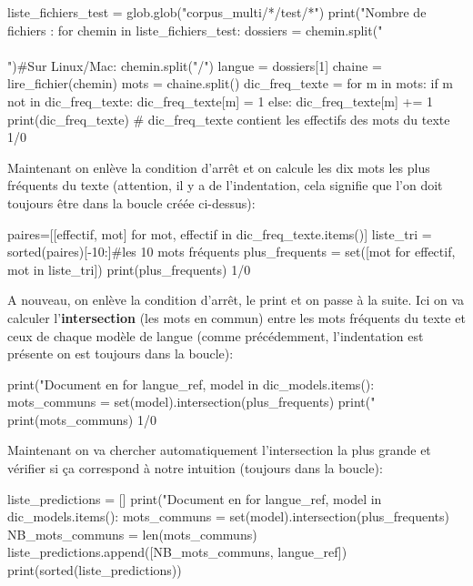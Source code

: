 \begin{python}
liste_fichiers_test = glob.glob("corpus_multi/*/test/*")
print("Nombre de fichiers : %
for chemin in liste_fichiers_test:
  dossiers = chemin.split("\\\\")#Sur Linux/Mac: chemin.split("/")
  langue = dossiers[1]
  chaine = lire_fichier(chemin)
  mots = chaine.split()
  dic_freq_texte = {}
  for m in mots:
    if m not in dic_freq_texte:
      dic_freq_texte[m] = 1
    else:
      dic_freq_texte[m] += 1
  print(dic_freq_texte)
  # dic_freq_texte contient les effectifs des mots du texte
  1/0
\end{python}

Maintenant on enlève la condition d'arrêt et on calcule les dix mots les plus fréquents du texte (attention, il y a de l'indentation, cela signifie que l'on doit toujours être dans la boucle créée ci-dessus):

\begin{python}
  paires=[[effectif, mot] for mot, effectif in  dic_freq_texte.items()]
  liste_tri = sorted(paires)[-10:]#les 10 mots fréquents
  plus_frequents = set([mot for effectif, mot in liste_tri])
  print(plus_frequents)
  1/0
\end{python}

A nouveau, on enlève la condition d'arrêt, le print et on passe à la suite. Ici on va calculer l'\textbf{intersection} (les mots en commun) entre les mots fréquents du texte et ceux de chaque modèle de langue (comme précédemment, l'indentation est présente on est toujours dans la boucle):

\begin{python}
  print("Document en %
  for langue_ref, model in dic_models.items():
    mots_communs = set(model).intersection(plus_frequents)
    print("%
    print(mots_communs)
  1/0
\end{python}

Maintenant on va chercher automatiquement l'intersection la plus grande et vérifier si ça correspond à notre intuition (toujours dans la boucle):

\begin{python}
  liste_predictions = []
  print("Document en %
  for langue_ref, model in dic_models.items():
    mots_communs = set(model).intersection(plus_frequents)
    NB_mots_communs = len(mots_communs)
    liste_predictions.append([NB_mots_communs, langue_ref])
    print(sorted(liste_predictions))
\end{python}

